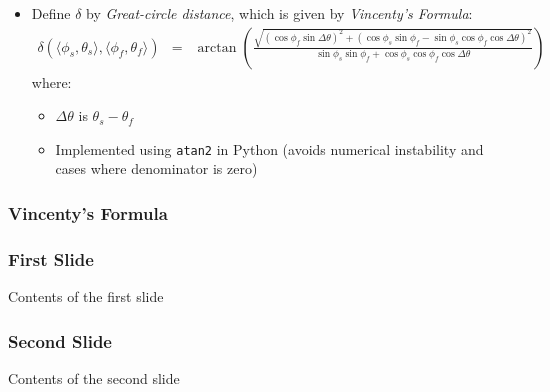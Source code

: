 \begin{frame}[allowframebreaks]
\framebreak
\begin{itemize}
	\item Define $\delta$ by \emph{Great-circle distance}, which is given by \emph{Vincenty's Formula}:
	\begin{eqnarray*}
  \delta (\langle \phi_s, \theta_s \rangle, \langle \phi_f, \theta_f \rangle)
  & = & \arctan \left( \frac{\sqrt{\left( \cos \phi_f \sin \Delta
  \theta \right)^2 + \left( \cos \phi_s \sin \phi_f - \sin \phi_s \cos \phi_f
  \cos \Delta \theta \right)^2}}{\sin \phi_s \sin \phi_f + \cos \phi_s \cos
  \phi_f \cos \Delta \theta} \right)
	\end{eqnarray*}
where:
	\begin{itemize}
	\item $\Delta \theta$ is $\theta_s-\theta_f$
	\item Implemented using \texttt{atan2} in Python (avoids numerical instability and cases where denominator is zero)
	\end{itemize}
\end{itemize}
\end{frame}

\begin{frame}
\frametitle{Vincenty's Formula}

\end{frame}

\begin{frame}
\frametitle{First Slide}
Contents of the first slide
\end{frame}
\begin{frame}
\frametitle{Second Slide}
Contents of the second slide
\end{frame}

